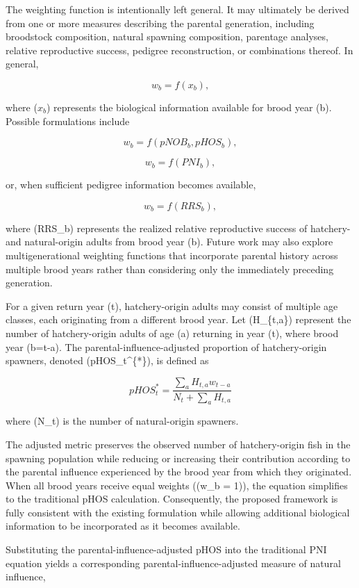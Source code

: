 \documentclass[12pt,letterpaper]{article}
\begin{document}
The weighting function is intentionally left general. It may ultimately be derived from one or more measures describing the parental generation, including broodstock composition, natural spawning composition, parentage analyses, relative reproductive success, pedigree reconstruction, or combinations thereof. In general,

\[
w_b=f(x_b),
\]

where (\(x_b\)) represents the biological information available for brood year (b). Possible formulations include

\[
w_b=f(pNOB_b,pHOS_b),
\]

\[
w_b=f(PNI_b),
\]

or, when sufficient pedigree information becomes available,

\[
w_b=f(RRS_b),
\]

where (RRS\_b) represents the realized relative reproductive success of hatchery- and natural-origin adults from brood year (b). Future work may also explore multigenerational weighting functions that incorporate parental history across multiple brood years rather than considering only the immediately preceding generation.

For a given return year (t), hatchery-origin adults may consist of multiple age classes, each originating from a different brood year. Let (H\_\{t,a\}) represent the number of hatchery-origin adults of age (a) returning in year (t), where brood year (b=t-a). The parental-influence-adjusted proportion of hatchery-origin spawners, denoted (pHOS\_t\^{}\{*\}), is defined as

\[
pHOS_t^{*} =
\frac{
\sum_a H_{t,a}w_{t-a}
}
{
N_t+\sum_a H_{t,a}
}
\]

where (N\_t) is the number of natural-origin spawners.

The adjusted metric preserves the observed number of hatchery-origin fish in the spawning population while reducing or increasing their contribution according to the parental influence experienced by the brood year from which they originated. When all brood years receive equal weights ((w\_b = 1)), the equation simplifies to the traditional pHOS calculation. Consequently, the proposed framework is fully consistent with the existing formulation while allowing additional biological information to be incorporated as it becomes available.

Substituting the parental-influence-adjusted pHOS into the traditional PNI equation yields a corresponding parental-influence-adjusted measure of natural influence,
\end{document}
